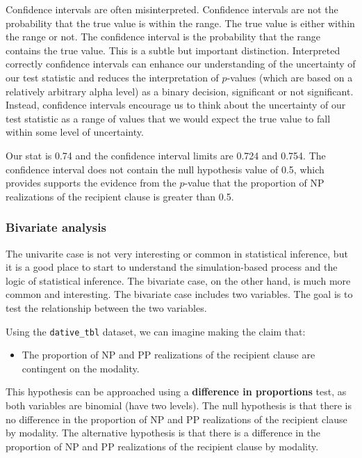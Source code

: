 \documentclass[
  letterpaper,
]{latex/krantz}
\providecommand{\tightlist}{%
  \setlength{\itemsep}{0pt}\setlength{\parskip}{0pt}}\usepackage{longtable,booktabs,array}
\theoremstyle{definition}
\theoremstyle{remark}
\begin{document}
Confidence intervals are often misinterpreted. Confidence intervals are
not the probability that the true value is within the range. The true
value is either within the range or not. The confidence interval is the
probability that the range contains the true value. This is a subtle but
important distinction. Interpreted correctly confidence intervals can
enhance our understanding of the uncertainty of our test statistic and
reduces the interpretation of \(p\)-values (which are based on a
relatively arbitrary alpha level) as a binary decision, significant or
not significant. Instead, confidence intervals encourage us to think
about the uncertainty of our test statistic as a range of values that we
would expect the true value to fall within some level of uncertainty.

Our stat is 0.74 and the confidence interval limits are 0.724 and 0.754.
The confidence interval does not contain the null hypothesis value of
0.5, which provides supports the evidence from the \(p\)-value that the
proportion of NP realizations of the recipient clause is greater than
0.5.

\subsubsection{Bivariate analysis}\label{sec-infer-cat-bivariate}

The univarite case is not very interesting or common in statistical
inference, but it is a good place to start to understand the
simulation-based process and the logic of statistical inference. The
bivariate case, on the other hand, is much more common and interesting.
The bivariate case includes two variables. The goal is to test the
relationship between the two variables.

Using the \texttt{dative\_tbl} dataset, we can imagine making the claim
that:

\begin{itemize}
\tightlist
\item
  The proportion of NP and PP realizations of the recipient clause are
  contingent on the modality.
\end{itemize}

This hypothesis can be approached using a \textbf{difference in
proportions} test, as both variables are binomial (have two levels). The
null hypothesis is that there is no difference in the proportion of NP
and PP realizations of the recipient clause by modality. The alternative
hypothesis is that there is a difference in the proportion of NP and PP
realizations of the recipient clause by modality.
\end{document}
